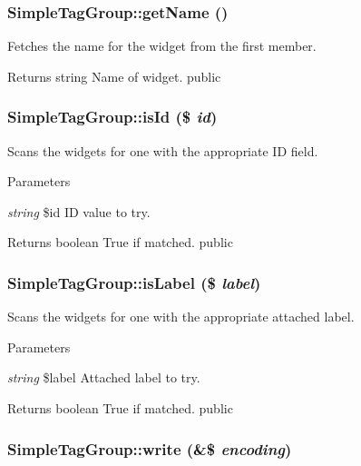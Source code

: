\hypertarget{class_simple_tag_group_a69dae8d1ffa832734b4f533d5cd9d9c9}{
\subsubsection[{getName}]{\setlength{\rightskip}{0pt plus 5cm}SimpleTagGroup::getName ()}}
\label{class_simple_tag_group_a69dae8d1ffa832734b4f533d5cd9d9c9}
Fetches the name for the widget from the first member. \begin{DoxyReturn}{Returns}
string Name of widget.  public 
\end{DoxyReturn}
\hypertarget{class_simple_tag_group_a8595e023fdedb78e15773de25333b963}{
\subsubsection[{isId}]{\setlength{\rightskip}{0pt plus 5cm}SimpleTagGroup::isId (\$ {\em id})}}
\label{class_simple_tag_group_a8595e023fdedb78e15773de25333b963}
Scans the widgets for one with the appropriate ID field. 
\begin{DoxyParams}{Parameters}
\item[{\em string}]\$id ID value to try. \end{DoxyParams}
\begin{DoxyReturn}{Returns}
boolean True if matched.  public 
\end{DoxyReturn}
\hypertarget{class_simple_tag_group_ab89e430363d358093bdfe2fb1e2290f9}{
\subsubsection[{isLabel}]{\setlength{\rightskip}{0pt plus 5cm}SimpleTagGroup::isLabel (\$ {\em label})}}
\label{class_simple_tag_group_ab89e430363d358093bdfe2fb1e2290f9}
Scans the widgets for one with the appropriate attached label. 
\begin{DoxyParams}{Parameters}
\item[{\em string}]\$label Attached label to try. \end{DoxyParams}
\begin{DoxyReturn}{Returns}
boolean True if matched.  public 
\end{DoxyReturn}
\hypertarget{class_simple_tag_group_a2fc52631817cbe0d5bd5f7dda5cf87ec}{
\subsubsection[{write}]{\setlength{\rightskip}{0pt plus 5cm}SimpleTagGroup::write (\&\$ {\em encoding})}}
